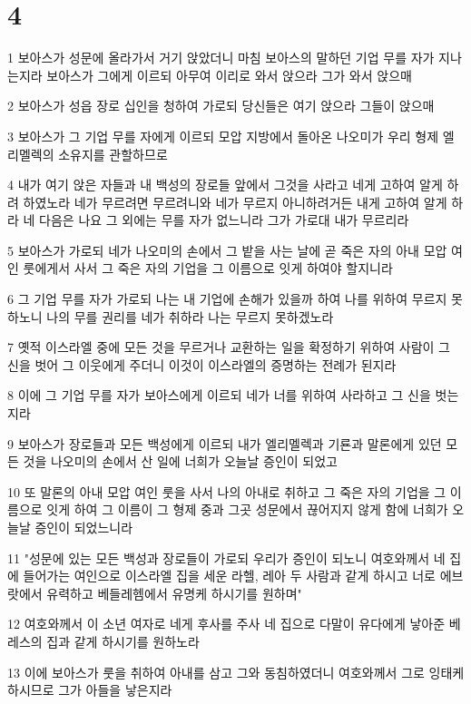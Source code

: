 \chapter{4}

\par 1 보아스가 성문에 올라가서 거기 앉았더니 마침 보아스의 말하던 기업 무를 자가 지나는지라 보아스가 그에게 이르되 아무여 이리로 와서 앉으라 그가 와서 앉으매
\par 2 보아스가 성읍 장로 십인을 청하여 가로되 당신들은 여기 앉으라 그들이 앉으매
\par 3 보아스가 그 기업 무를 자에게 이르되 모압 지방에서 돌아온 나오미가 우리 형제 엘리멜렉의 소유지를 관할하므로
\par 4 내가 여기 앉은 자들과 내 백성의 장로들 앞에서 그것을 사라고 네게 고하여 알게 하려 하였노라 네가 무르려면 무르려니와 네가 무르지 아니하려거든 내게 고하여 알게 하라 네 다음은 나요 그 외에는 무를 자가 없느니라 그가 가로대 내가 무르리라
\par 5 보아스가 가로되 네가 나오미의 손에서 그 밭을 사는 날에 곧 죽은 자의 아내 모압 여인 룻에게서 사서 그 죽은 자의 기업을 그 이름으로 잇게 하여야 할지니라
\par 6 그 기업 무를 자가 가로되 나는 내 기업에 손해가 있을까 하여 나를 위하여 무르지 못하노니 나의 무를 권리를 네가 취하라 나는 무르지 못하겠노라
\par 7 옛적 이스라엘 중에 모든 것을 무르거나 교환하는 일을 확정하기 위하여 사람이 그 신을 벗어 그 이웃에게 주더니 이것이 이스라엘의 증명하는 전례가 된지라
\par 8 이에 그 기업 무를 자가 보아스에게 이르되 네가 너를 위하여 사라하고 그 신을 벗는지라
\par 9 보아스가 장로들과 모든 백성에게 이르되 내가 엘리멜렉과 기룐과 말론에게 있던 모든 것을 나오미의 손에서 산 일에 너희가 오늘날 증인이 되었고
\par 10 또 말론의 아내 모압 여인 룻을 사서 나의 아내로 취하고 그 죽은 자의 기업을 그 이름으로 잇게 하여 그 이름이 그 형제 중과 그곳 성문에서 끊어지지 않게 함에 너희가 오늘날 증인이 되었느니라
\par 11 "성문에 있는 모든 백성과 장로들이 가로되 우리가 증인이 되노니 여호와께서 네 집에 들어가는 여인으로 이스라엘 집을 세운 라헬, 레아 두 사람과 같게 하시고 너로 에브랏에서 유력하고 베들레헴에서 유명케 하시기를 원하며"
\par 12 여호와께서 이 소년 여자로 네게 후사를 주사 네 집으로 다말이 유다에게 낳아준 베레스의 집과 같게 하시기를 원하노라
\par 13 이에 보아스가 룻을 취하여 아내를 삼고 그와 동침하였더니 여호와께서 그로 잉태케 하시므로 그가 아들을 낳은지라
